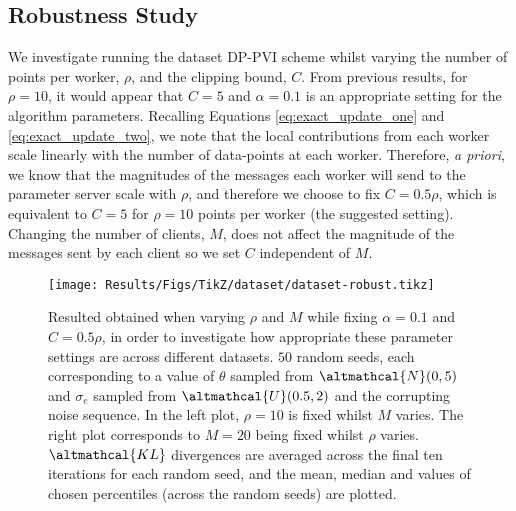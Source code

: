 \subsection{Robustness Study}
We investigate running the dataset DP-PVI scheme whilst varying the number of points per worker, $\rho$, and the clipping bound, $C$. From previous results, for $\rho=10$, it would appear that $C=5$ and $\alpha=0.1$ is an appropriate setting for the algorithm parameters. Recalling Equations \eqref{eq:exact_update_one} and \eqref{eq:exact_update_two}, we note that the local contributions from each worker scale linearly with the number of data-points at each worker. Therefore, \emph{a priori}, we know that the magnitudes of the messages each worker will send to the parameter server scale with $\rho$, and therefore we choose to fix $C = 0.5\rho$, which is equivalent to $C=5$ for $\rho = 10$ points per worker (the suggested setting). Changing the number of clients, $M$, does not affect the magnitude of the messages sent by each client so we set $C$ independent of $M$.

\begin{figure}
	\texttt{[image: Results/Figs/TikZ/dataset/dataset-robust.tikz]}
	\centering
	\caption{\label{fig:results-dataset-robust} Resulted obtained when varying $\rho$ and $M$ while fixing $\alpha = 0.1$ and $C = 0.5\rho$, in order to investigate how appropriate these parameter settings are across different datasets. $50$ random seeds, each corresponding to a value of $\theta$ sampled from $\altmathcal{N}(0, 5)$ and $\sigma_e$ sampled from $\altmathcal{U}(0.5, 2)$ and the corrupting noise sequence. In the left plot, $\rho = 10$ is fixed whilst $M$ varies. The right plot corresponds to $M=20$ being fixed whilst $\rho$ varies.  $\altmathcal{KL}$ divergences are averaged across the final ten iterations for each random seed, and the mean, median and values of chosen percentiles (across the random seeds) are plotted. }
\end{figure}

